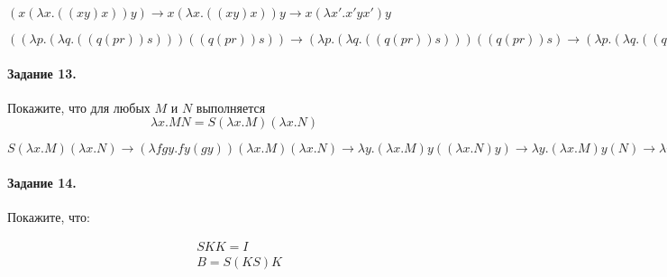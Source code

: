 \documentclass[a4paper,12pt]{article}
\begin{document}
\begin{Solution}

$\left(x\left(\lambda x . \left(\left(xy\right)x\right)\right)y\right) \rightarrow x\left(\lambda x . \left(\left(xy\right)x\right)\right)y \rightarrow x\left(\lambda x' . x'yx'\right)y$

$\left(\left(\lambda p.\left(\lambda q .\left(\left(q\left(pr\right)\right)s\right)\right)\right)\left(\left(q\left(pr\right)\right)s\right)\right) \rightarrow \left(\lambda p.\left(\lambda q .\left(\left(q\left(pr\right)\right)s\right)\right)\right)\left(\left(q\left(pr\right)\right)s\right) \rightarrow \left(\lambda p.\left(\lambda q .\left(\left(q\left(pr\right)\right)s\right)\right)\right)\left(q\left(pr\right)s\right) \rightarrow \left(\lambda p.\left(\lambda q .\left(q\left(pr\right)s\right)\right)\right)\left(q\left(pr\right)s\right) \rightarrow \left(\lambda pq.q\left(pr\right)s\right)\left(q\left(pr\right)s\right) \rightarrow \left(\lambda p'q'.q'\left(p'r\right)s\right)\left(q\left(pr\right)s\right) \rightarrow \lambda q'.q'\left(q\left(pr\right)sr\right)s$

\end{Solution}

\paragraph{Задание 13.} Покажите, что для любых $M$ и $N$ выполняется $$ \lambda x . M N = S\left(\lambda x . M\right)\left(\lambda x . N\right) $$

\begin{Solution}

$S\left(\lambda x . M\right)\left(\lambda x . N\right) \rightarrow \left(\lambda fgy . fy \left(gy\right)\right)\left(\lambda x . M\right)\left(\lambda x . N\right) \rightarrow \lambda y . \left(\lambda x . M\right)y \left(\left(\lambda x . N\right)y\right) \rightarrow \lambda y . \left(\lambda x . M\right)y \left(N\right) \rightarrow \lambda y . MN$

\end{Solution}

\paragraph{Задание 14.} Покажите, что:

\[
	\begin{split}
		&SKK = I\\
		&B = S\left(KS\right)K\\
	\end{split}
\]
\end{document}
